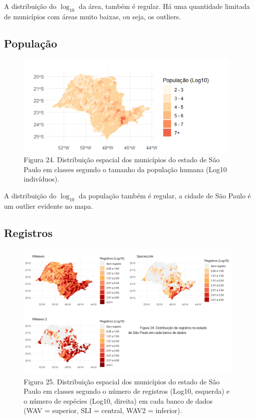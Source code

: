 \begin{resposta}
A distribuição do $\log_{10}$ da área, também é regular. Há uma quantidade limitada de municípios com áreas muito baixas, ou seja, os outliers.
\end{resposta}


\subsection {População}

\newpage

\begin{figure}[h!]
\centering
\includegraphics[height = 5cm]{Imagens/M03.png}
\\{\scriptsize Figura 24. Distribuição espacial dos municípios do estado de São Paulo em classes segundo o tamanho da população humana (Log10 indivíduos).}
\end{figure}

\begin{resposta}
A distribuição do $\log_{10}$ da população também é regular, a cidade de São Paulo é um outlier evidente no mapa.
\end{resposta}

\subsection {Registros}

\begin{figure}[h!]
\centering
\includegraphics[width=17cm]{Imagens/M04.png}
\\{\scriptsize Figura 25. Distribuição espacial dos municípios do estado de São Paulo em classes segundo o número de registros (Log10, esquerda) e o número de espécies (Log10, direita) em cada banco de dados (WAV = superior, SLI = central, WAV2 = inferior).}
\end{figure}

